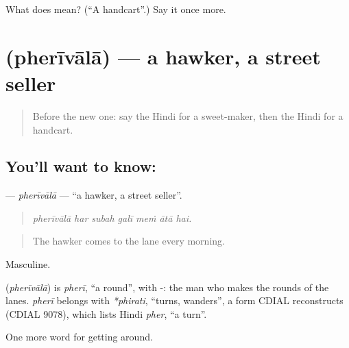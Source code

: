 \begin{tcolorbox}[breakable,colback=teal!4,colframe=teal!35!black,title={Before you move on}]
What does  mean? (\textquotedblleft{}A handcart\textquotedblright{}.) Say it once more.
\end{tcolorbox}
\section[\texorpdfstring{\hi{फेरीवाला} (pherīvālā)}{फेरीवाला (pherīvālā)}]{ (pherīvālā) — a hawker, a street seller}

\label{lesson:HI-C424-pherivala}



\begin{quote}
Before the new one: say the Hindi for a sweet-maker, then the Hindi for a handcart.
\end{quote}

\subsection*{You'll want to know: }
\textbf{} — \emph{pherīvālā} — \textquotedblleft{}a hawker, a street seller\textquotedblright{}.

\begin{quote}
      
\end{quote}

\begin{quote}
\emph{pherīvālā har subah galī meṁ ātā hai.}
\end{quote}

\begin{quote}
The hawker comes to the lane every morning.
\end{quote}

Masculine.

\begin{cousinweb}
\textbf{} (\emph{pherīvālā}) is \emph{pherī}, \textquotedblleft{}a round\textquotedblright{}, with -: the man who makes the rounds of the lanes. \emph{pherī} belongs with \emph{*phirati}, \textquotedblleft{}turns, wanders\textquotedblright{}, a form CDIAL reconstructs (CDIAL 9078), which lists Hindi \emph{pher}, \textquotedblleft{}a turn\textquotedblright{}.
\end{cousinweb}

\begin{grammarlens}[title={What you've built}]
One more word for getting around.
\end{grammarlens}

